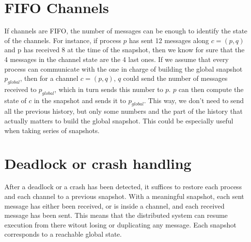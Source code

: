 \documentclass{article}
\begin{document}
\section{FIFO Channels}

If channels are FIFO, the number of messages can be enough to identify the state of the channels.
For instance, if process $p$ has sent 12 messages along $c=(p,q)$ and p has received 8 at the time of the snapshot, then we know for sure that the 4 messages in the channel state are the 4 last ones.
If we assume that every process can communicate with the one in charge of building the global snapshot $p_{global}$, then for a channel $c=(p,q)$, $q$ could send the number of messages received to $p_{global}$, which in turn sends this number to $p$. $p$ can then compute the state of $c$ in the snapshot and sends it to $p_{global}$.
This way, we don't need to send all the previous history, but only some numbers and the part of the history that actually matters to build the global snapshot. This could be especially useful when taking series of snapshots.

\section{Deadlock or crash handling}

After a deadlock or a crash has been detected, it suffices to restore each process and each channel to a previous snapshot.
With a meaningful snapshot, each sent message has either been received, or is inside a channel, and each received message has been sent. This means that the distributed system can resume execution from there witout losing or duplicating any message.
Each snapshot corresponds to a reachable global state.
\end{document}
